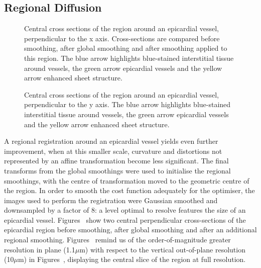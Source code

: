   
  \subsection{Regional Diffusion} %
  \label{sub:regional_diffusion}
      \begin{figure}[p]
        \caption{Central cross sections of the region around an epicardial vessel, perpendicular to the x axis. Cross-sections are compared before smoothing, after global smoothing and after smoothing applied to this region. The blue arrow highlights blue-stained interstitial tissue around vessels, the green arrow epicardial vessels and the yellow arrow enhanced sheet structure.}
      \end{figure}
    
      \begin{figure}[p]
        \caption{Central cross sections of the region around an epicardial vessel, perpendicular to the y axis.  The blue arrow highlights blue-stained interstitial tissue around vessels, the green arrow epicardial vessels and the yellow arrow enhanced sheet structure.}
      \end{figure}
    
    
      A regional registration around an epicardial vessel yields even further improvement, when at this smaller scale, curvature and distortions not represented by an affine transformation become less significant. The final transforms from the global smoothings were used to initialise the regional smoothings, with the centre of transformation moved to the geometric centre of the region. In order to smooth the cost function adequately for the optimiser, the images used to perform the registration were Gaussian smoothed and downsampled by a factor of 8: a level optimal to resolve features the size of an epicardial vessel. Figures~ show two central perpendicular cross-sections of the epicardial region before smoothing, after global smoothing and after an additional regional smoothing. Figures~ remind us of the order-of-magnitude greater resolution in plane (1.1$\mu$m) with respect to the vertical out-of-plane resolution (10$\mu$m) in Figures~, displaying the central slice of the region at full resolution.
    
